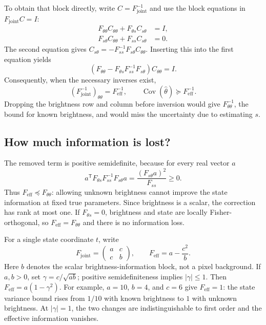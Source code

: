 \documentclass[11pt,a4paper]{article}
\begin{document}
To obtain that block directly, write
$C=F_{\mathrm{joint}}^{-1}$ and use the block equations in
$F_{\mathrm{joint}}C=I$:
\begin{align}
 F_{\theta\theta}C_{\theta\theta}
 +F_{\theta s}C_{s\theta}&=I,\\
 F_{s\theta}C_{\theta\theta}+F_{ss}C_{s\theta}&=0.
\end{align}
The second equation gives
$C_{s\theta}=-F_{ss}^{-1}F_{s\theta}C_{\theta\theta}$.
Inserting this into the first equation yields
\begin{equation}
 \left(F_{\theta\theta}-F_{\theta s}F_{ss}^{-1}F_{s\theta}\right)
 C_{\theta\theta}=I.
\end{equation}
Consequently, when the necessary inverses exist,
\begin{equation}
 (F_{\mathrm{joint}}^{-1})_{\theta\theta}=F_{\mathrm{eff}}^{-1},
 \qquad
 \operatorname{Cov}(\widehat\theta)\succeq F_{\mathrm{eff}}^{-1}.
\end{equation}
Dropping the brightness row and column before inversion would give
$F_{\theta\theta}^{-1}$, the bound for known brightness, and would miss
the uncertainty due to estimating $s$.

\subsection{How much information is lost?}
The removed term is positive semidefinite, because for every real vector $a$
\begin{equation}
 a^{\mathsf T}F_{\theta s}F_{ss}^{-1}F_{s\theta}a
 =\frac{(F_{s\theta}a)^2}{F_{ss}}\ge0.
\end{equation}
Thus $F_{\mathrm{eff}}\preceq F_{\theta\theta}$: allowing unknown
brightness cannot improve the state information at fixed true parameters.
Since brightness is a scalar, the correction has rank at most one.
If $F_{\theta s}=0$, brightness and state are locally Fisher-orthogonal,
so $F_{\mathrm{eff}}=F_{\theta\theta}$ and there is no information loss.

For a single state coordinate $t$, write
\begin{equation}
 F_{\mathrm{joint}}=\begin{pmatrix}a&c\\c&b\end{pmatrix},
 \qquad F_{\mathrm{eff}}=a-\frac{c^2}{b}.
\end{equation}
Here $b$ denotes the scalar brightness-information block, not a pixel
background. If $a,b>0$, set $\gamma=c/\sqrt{ab}$; positive
semidefiniteness implies $|\gamma|\le1$. Then
$F_{\mathrm{eff}}=a(1-\gamma^2)$.
For example, $a=10$, $b=4$, and $c=6$ give $F_{\mathrm{eff}}=1$:
the state variance bound rises from $1/10$ with known brightness to $1$
with unknown brightness. At $|\gamma|=1$, the two changes are
indistinguishable to first order and the effective information vanishes.
\end{document}
